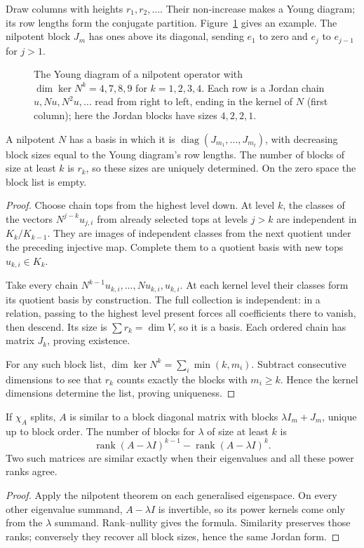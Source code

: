 Draw columns with heights $r_1,r_2,\ldots$. Their non-increase makes a Young diagram; its row lengths form the conjugate partition. Figure~\ref{linear:fig:young} gives an example. The nilpotent block $J_m$ has ones above its diagonal, sending $e_1$ to zero and $e_j$ to $e_{j-1}$ for $j>1$.
\begin{figure}[ht]
\centering
{}
\caption{The Young diagram of a nilpotent operator with $\dim\ker N^k=4,7,8,9$ for $k=1,2,3,4$. Each row is a Jordan
chain $u,Nu,N^2u,\dots$ read from right to left, ending in the kernel of $N$ (first column); here the Jordan blocks have
sizes $4,2,2,1$.}
\label{linear:fig:young}
\end{figure}

\begin{theorem}\label{linear:thm:jordannil}
A nilpotent $N$ has a basis in which it is $\operatorname{diag}(J_{m_1},\ldots,J_{m_t})$, with decreasing block sizes equal to the Young diagram's row lengths. The number of blocks of size at least $k$ is $r_k$, so these sizes are uniquely determined. On the zero space the block list is empty.
\end{theorem}
\begin{proof}
Choose chain tops from the highest level down. At level $k$, the classes of the vectors $N^{j-k}u_{j,i}$ from already selected tops at levels $j>k$ are independent in $K_k/K_{k-1}$. They are images of independent classes from the next quotient under the preceding injective map. Complete them to a quotient basis with new tops $u_{k,i}\in K_k$.

Take every chain $N^{k-1}u_{k,i},\ldots,Nu_{k,i},u_{k,i}$. At each kernel level their classes form its quotient basis by construction. The full collection is independent: in a relation, passing to the highest level present forces all coefficients there to vanish, then descend. Its size is $\sum r_k=\dim V$, so it is a basis. Each ordered chain has matrix $J_k$, proving existence.

For any such block list, $\dim\ker N^k=\sum_i\min(k,m_i)$. Subtract consecutive dimensions to see that $r_k$ counts exactly the blocks with $m_i\ge k$. Hence the kernel dimensions determine the list, proving uniqueness.
\end{proof}

\begin{corollary}\label{linear:cor:jordan}
If $\chi_A$ splits, $A$ is similar to a block diagonal matrix with blocks $\lambda I_m+J_m$, unique up to block order. The number of blocks for $\lambda$ of size at least $k$ is
\[\operatorname{rank}(A-\lambda I)^{k-1}-\operatorname{rank}(A-\lambda I)^k.
\]
Two such matrices are similar exactly when their eigenvalues and all these power ranks agree.
\end{corollary}
\begin{proof}
Apply the nilpotent theorem on each generalised eigenspace. On every other eigenvalue summand, $A-\lambda I$ is invertible, so its power kernels come only from the $\lambda$ summand. Rank--nullity gives the formula. Similarity preserves those ranks; conversely they recover all block sizes, hence the same Jordan form.
\end{proof}

